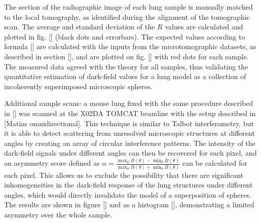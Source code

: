 The section of the radiographic image of each lung sample is manually
matched to the local tomography, as identified during the alignment of the
tomographic scan. The average and standard deviation of the $R$ values are
calculated and plotted in fig. [] (black dots and errorbars). The expected
values according to formula [] are calculated with the inputs from the
microtomographic datasets, as described in section [], and are plotted on
fig. [] with red dots for each sample. The measured data agreed with the
theory for all samples, thus validating the quantitative estimation of
dark-field values for a lung model as a collection of incoherently
superimposed microscopic spheres.

Additional sample scans: a mouse lung fixed with the same procedure
described in [] was scanned at the X02DA TOMCAT beamline with the setup
described in [Matias omnidirectional]. This technique is similar to Talbot
interferometry, but it is able to detect scattering from unresolved
microscopic structures at different angles by creating an array of circular
interference patterns. The intensity of the dark-field signals under
different angles can then be recovered for each pixel, and an asymmetry
score defined as $\alpha = \frac{\max_\theta{B(\theta)} -
\min_\theta{B(\theta)}}{\max_\theta{B(\theta)} + \min_\theta{B(\theta)}}$ can
be calculated for each pixel. This allows us to exclude the possibility that
there are significant inhomogeneities in the dark-field response of the lung
structures under different angles, which would directly invalidate the model
of a superposition of spheres. The results are shown in figure [] and as a
histogram [], demonstrating a limited asymmetry over the whole sample.
